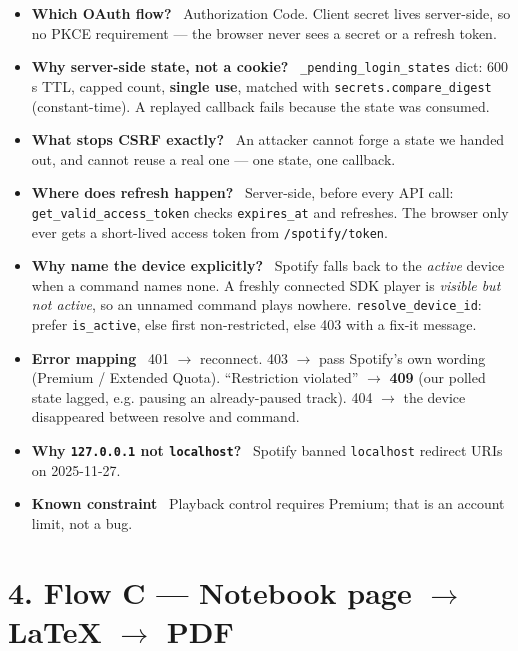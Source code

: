 \documentclass[10pt]{article}
\newcommand{\qa}[2]{\item \textbf{#1} \, #2}
\newcommand{\code}[1]{\texttt{\small #1}}
\begin{document}
\begin{itemize}
\qa{Which OAuth flow?}{Authorization Code. Client secret lives server-side, so no PKCE requirement --- the browser never sees a secret or a refresh token.}
\qa{Why server-side state, not a cookie?}{\code{\_pending\_login\_states} dict: 600\,s TTL, capped count, \textbf{single use}, matched with \code{secrets.compare\_digest} (constant-time). A replayed callback fails because the state was consumed.}
\qa{What stops CSRF exactly?}{An attacker cannot forge a state we handed out, and cannot reuse a real one --- one state, one callback.}
\qa{Where does refresh happen?}{Server-side, before every API call: \code{get\_valid\_access\_token} checks \code{expires\_at} and refreshes. The browser only ever gets a short-lived access token from \code{/spotify/token}.}
\qa{Why name the device explicitly?}{Spotify falls back to the \emph{active} device when a command names none. A freshly connected SDK player is \emph{visible but not active}, so an unnamed command plays nowhere. \code{resolve\_device\_id}: prefer \code{is\_active}, else first non-restricted, else 403 with a fix-it message.}
\qa{Error mapping}{401 $\to$ reconnect. 403 $\to$ pass Spotify's own wording (Premium / Extended Quota). ``Restriction violated'' $\to$ \textbf{409} (our polled state lagged, e.g. pausing an already-paused track). 404 $\to$ the device disappeared between resolve and command.}
\qa{Why \code{127.0.0.1} not \code{localhost}?}{Spotify banned \code{localhost} redirect URIs on 2025-11-27.}
\qa{Known constraint}{Playback control requires Premium; that is an account limit, not a bug.}
\end{itemize}



\section*{4. Flow C --- Notebook page $\to$ LaTeX $\to$ PDF}
\end{document}
